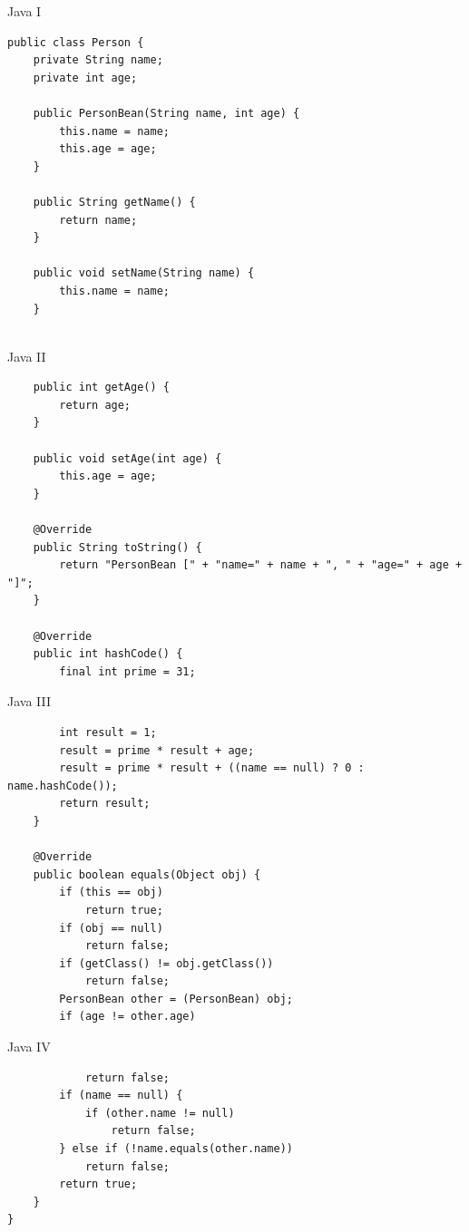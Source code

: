 \documentclass[10pt]{beamer}
\begin{document}
	\begin{frame}[fragile]{Java I}
		\begin{verbatim}
public class Person {
	private String name;
	private int age;
	
	public PersonBean(String name, int age) {
		this.name = name;
		this.age = age;
	}
	
	public String getName() {
		return name;
	}
	
	public void setName(String name) {
		this.name = name;
	}
	
		\end{verbatim}
\end{frame}
	\begin{frame}[fragile]{Java II}
		\begin{verbatim}
	public int getAge() {
		return age;
	}
	
	public void setAge(int age) {
		this.age = age;
	}
	
	@Override
	public String toString() {
		return "PersonBean [" + "name=" + name + ", " +	"age=" + age + "]";
	}
	
	@Override
	public int hashCode() {
		final int prime = 31;
		\end{verbatim}
\end{frame}
	\begin{frame}[fragile]{Java III}
		\begin{verbatim}
		int result = 1;
		result = prime * result + age;
		result = prime * result + ((name == null) ? 0 : name.hashCode());
		return result;
	}
	
	@Override
	public boolean equals(Object obj) {
		if (this == obj)
			return true;
		if (obj == null)
			return false;
		if (getClass() != obj.getClass())
			return false;
		PersonBean other = (PersonBean) obj;
		if (age != other.age)
		\end{verbatim}
\end{frame}
	\begin{frame}[fragile]{Java IV}
		\vspace{-2.5cm}
		\begin{verbatim}
			return false;
		if (name == null) {
			if (other.name != null)
				return false;
		} else if (!name.equals(other.name))
			return false;
		return true;
	}
}
		\end{verbatim}
\end{frame}
\end{document}
